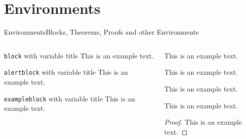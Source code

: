 \documentclass[aspectratio=169]{beamer}
\begin{document}
\section{Environments}
\begin{frame}[t]{Environments}{Blocks, Theorems, Proofs and other Environments}

  \begin{columns}[T]
    \begin{column}{.5\textwidth}
      \begin{block}{\texttt{block} with variable title}
        This is an \alert{example text}.
      \end{block}

      \begin{alertblock}{\texttt{alertblock} with variable title}
        This is an \alert{example text}.
      \end{alertblock}

      \begin{exampleblock}{\texttt{exampleblock} with variable title}
        This is an \alert{example text}.
      \end{exampleblock}
    \end{column}

    \begin{column}{.5\textwidth}

      \begin{definition}
        This is an \alert{example text}.
      \end{definition}

      \begin{lemma}
        This is an \alert{example text}.
      \end{lemma}

      \begin{theorem}
        This is an \alert{example text}.
      \end{theorem}

      \begin{corollary}
        This is an \alert{example text}.
      \end{corollary}

      \begin{proof}
        This is an \alert{example text}.
      \end{proof}



    \end{column}
  \end{columns}

\end{frame}
\end{document}
